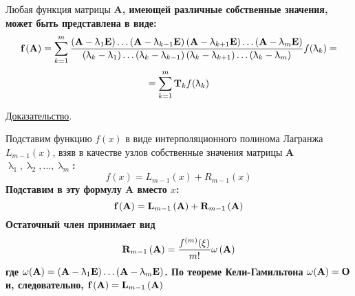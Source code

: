 \begin{theorem}
    Любая функция матрицы \bf{A}, имеющей различные собственные значения, может быть представлена в виде:
    \begin{equation}
        \bf{f}\left( \bf{A} \right) = \sum_{k=1}^{m} \frac{\left( \bf{A} - \uplambda_1 \bf{E} \right)\dots \left( \bf{A} - \uplambda_{k-1} \bf{E} \right)\left( \bf{A} - \uplambda_{k+1} \bf{E} \right)\dots \left( \bf{A} - \uplambda_m \bf{E} \right)}{\left( \uplambda_k - \uplambda_1 \right)\dots \left( \uplambda_k - \uplambda_{k-1} \right) \left( \uplambda_k - \uplambda_{k+1} \right)\dots \left( \uplambda_k - \uplambda_m \right)}f(\uplambda_k) = \label{eq:lagrange_sylvester}
    \end{equation}
    \begin{equation*}
        = \sum_{k=1}^{m} \bf{T}_k f(\uplambda_k)
    \end{equation*}

    \underline{Доказательство}.
    \vspace{5pt}

    Подставим функцию $f(x)$ в виде интерполяционного полинома Лагранжа $\displaystyle L_{m-1}(x)$, взяв в качестве
    узлов собственные значения матрицы \bf{A} $\uplambda_1, \uplambda_2, \dots, \uplambda_m$:
    \begin{equation*}
        f(x) = L_{m-1}(x) + R_{m-1}(x)
    \end{equation*}
    Подставим в эту формулу \bf{A} вместо $x$:
    \begin{equation*}
        \bf{f}\left( \bf{A} \right) = \bf{L}_{m-1}\left( \bf{A} \right) + \bf{R}_{m-1}\left( \bf{A} \right)
    \end{equation*}
    Остаточный член принимает вид
    \begin{equation*}
        \bf{R}_{m-1}\left( \bf{A} \right) = \frac{f^{(m)}(\xi)}{m!}\omega\left( \bf{A} \right)
    \end{equation*}
    где $\displaystyle \omega(\bf{A}) = \left( \bf{A} - \uplambda_1 \bf{E} \right)\dots \left( \bf{A} - \uplambda_m \bf{E} \right)$.
    По теореме Кели-Гамильтона $\omega(\bf{A}) = \bf{O}$ и, следовательно, $\displaystyle \bf{f}\left( \bf{A} \right) = \bf{L}_{m-1}\left( \bf{A} \right)$
\end{theorem}
